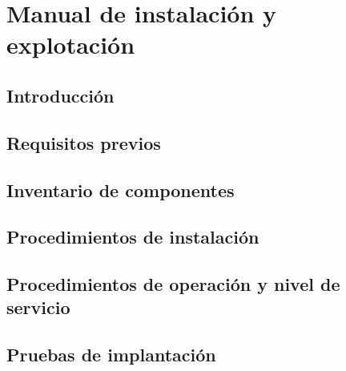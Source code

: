 \chapter{Manual de instalación y explotación}

\section{Introducción}

\section{Requisitos previos}

\section{Inventario de componentes}

\section{Procedimientos de instalación}

\section{Procedimientos de operación y nivel de servicio}

\section{Pruebas de implantación}